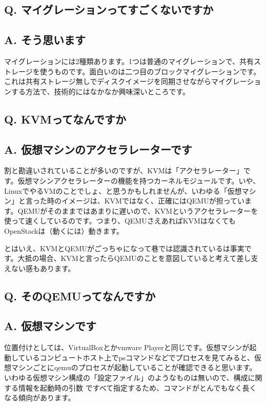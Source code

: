 \documentclass[9pt,b5paper,tombo,openany]{jsbook}
\begin{document}
\subsection*{{\LARGE\bfseries Q.} マイグレーションってすごくないですか}
\subsection*{{\LARGE\bfseries A.} そう思います}
マイグレーションには2種類あります。1つは普通のマイグレーションで、共有ストレージを使うものです。面白いのは二つ目のブロックマイグレーションです。これは共有ストレージ無しでディスクイメージを同期させながらマイグレーションする方法で、技術的にはなかなか興味深いところです。

\subsection*{{\LARGE\bfseries Q.} KVMってなんですか}
\subsection*{{\LARGE\bfseries A.} 仮想マシンのアクセラレーターです}
割と勘違いされていることが多いのですが、KVMは「アクセラレーター」です。仮想マシンアクセラレーターの機能を持つカーネルモジュールです。いや、LinuxでやるVMのことでしょ、と思うかもしれませんが、いわゆる「仮想マシン」と言った時のイメージは、KVMではなく、正確にはQEMUが担っています。QEMUがそのままではあまりに遅いので、KVMというアクセラレーターを使って速くしているのです。つまり、QEMUさえあればKVMはなくてもOpenStackは（動くには）動きます。

とはいえ、KVMとQEMUがごっちゃになって巷では認識されているは事実です。大抵の場合、KVMと言ったらQEMUのことを意図していると考えて差し支えない感もあります。

\subsection*{{\LARGE\bfseries Q.} そのQEMUってなんですか}
\subsection*{{\LARGE\bfseries A.} 仮想マシンです}
位置付けとしては、VirtualBoxとかvmware Playerと同じです。仮想マシンが起動しているコンピュートホスト上でpsコマンドなどでプロセスを見てみると、仮想マシンごとにqemuのプロセスが起動していることが確認できると思います。いわゆる仮想マシン構成の「設定ファイル」のようなものは無いので、構成に関する情報を起動時の引数
ですべて指定するため、コマンドがとんでもなく長くなる傾向があります。
\end{document}
